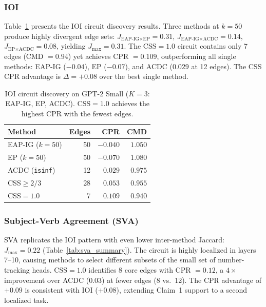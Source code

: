 \documentclass[11pt,a4paper]{article}
\newcommand{\css}{\textsc{CSS}}
\begin{document}
\subsubsection{IOI}

Table~\ref{tab:ioi_summary} presents the IOI circuit discovery results.
Three methods at $k\!=\!50$ produce highly divergent edge sets: $J_{\text{EAP-IG} \times \text{EP}}\!=\!0.31$, $J_{\text{EAP-IG} \times \text{ACDC}}\!=\!0.14$, $J_{\text{EP} \times \text{ACDC}}\!=\!0.08$, yielding $J_{\max}\!=\!0.31$.
The \css{}$=1.0$ circuit contains only 7 edges (CMD $= 0.94$) yet achieves CPR $= 0.109$, outperforming all single methods: EAP-IG ($-0.04$), EP ($-0.07$), and ACDC ($0.029$ at 12 edges).
The CSS CPR advantage is $\Delta = +0.08$ over the best single method.

\begin{table}[t]
\centering
\small
\begin{tabular}{lrrr}
\toprule
\textbf{Method} & \textbf{Edges} & \textbf{CPR} & \textbf{CMD} \\
\midrule
EAP-IG ($k\!=\!50$) & 50 & $-0.040$ & $1.050$ \\
EP ($k\!=\!50$) & 50 & $-0.070$ & $1.080$ \\
ACDC (\texttt{isinf}) & 12 & $0.029$ & $0.975$ \\
\midrule
\css{}$\ge 2/3$ & 28 & $0.053$ & $0.955$ \\
\css{}$= 1.0$ & 7 & $\mathbf{0.109}$ & $0.940$ \\
\bottomrule
\end{tabular}
\caption{IOI circuit discovery on GPT-2 Small ($K\!=\!3$: EAP-IG, EP, ACDC). \css{}$=1.0$ achieves the highest CPR with the fewest edges.}
\label{tab:ioi_summary}
\end{table}

\subsubsection{Subject-Verb Agreement (SVA)}

SVA replicates the IOI pattern with even lower inter-method Jaccard: $J_{\max}\!=\!0.22$ (Table~\ref{tab:sva_summary}).
The circuit is highly localized in layers 7--10, causing methods to select different subsets of the small set of number-tracking heads.
\css{}$=1.0$ identifies 8 core edges with CPR $= 0.12$, a $4\times$ improvement over ACDC ($0.03$) at fewer edges (8 vs.\ 12).
The CPR advantage of $+0.09$ is consistent with IOI ($+0.08$), extending Claim~1 support to a second localized task.
\end{document}
